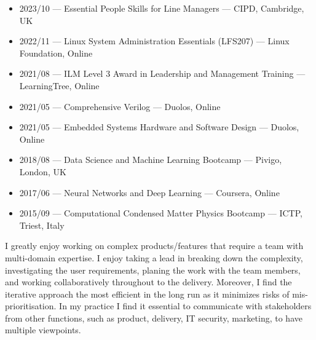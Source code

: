 \documentclass[10pt,a4paper,ragged2e,withhyper]{altacv}
\begin{document}
\begin{paracol}{2}
\begin{itemize}
    
    \item
    2023/10 --- Essential People Skills for Line Managers --- CIPD, Cambridge, UK

    \item
    2022/11 --- Linux System Administration Essentials (LFS207) --- Linux Foundation, Online
    
    \item
    2021/08 --- ILM Level 3 Award in Leadership and Management Training --- LearningTree, Online
    
    \item
    2021/05 --- Comprehensive Verilog --- Duolos, Online
    
    \item
    2021/05 --- Embedded Systems Hardware and Software Design --- Duolos, Online
    
    \item
    2018/08 --- Data Science and Machine Learning Bootcamp --- Pivigo, London, UK
    
    \item
    2017/06 --- Neural Networks and Deep Learning --- Coursera, Online
    
    \item
    2015/09 --- Computational Condensed Matter Physics Bootcamp --- ICTP, Triest, Italy
    
\end{itemize}



I greatly enjoy working on complex products/features that require a team with multi-domain
expertise.
I enjoy taking a lead in breaking down the complexity, investigating the user requirements,
planing the work with the team members, and working collaboratively throughout to the delivery.
Moreover, I find the iterative approach the most efficient in the long run as it minimizes
risks of mis-prioritisation.
In my practice I find it essential to communicate with stakeholders from other functions, such as
product, delivery, IT security, marketing, to have multiple viewpoints.



\end{paracol}
\end{document}
